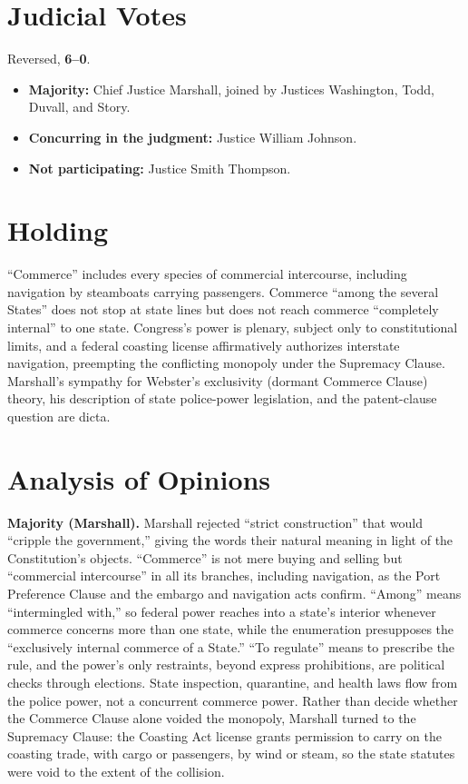 \documentclass[12pt]{article}
\begin{document}
\section{Judicial Votes}

Reversed, \textbf{6--0}.
\begin{itemize}
\item \textbf{Majority:} Chief Justice Marshall, joined by Justices Washington, Todd, Duvall, and Story.
\item \textbf{Concurring in the judgment:} Justice William Johnson.
\item \textbf{Not participating:} Justice Smith Thompson.
\end{itemize}

\section{Holding}

``Commerce'' includes every species of commercial intercourse, including navigation by steamboats carrying passengers. Commerce ``among the several States'' does not stop at state lines but does not reach commerce ``completely internal'' to one state. Congress's power is plenary, subject only to constitutional limits, and a federal coasting license affirmatively authorizes interstate navigation, preempting the conflicting monopoly under the Supremacy Clause. Marshall's sympathy for Webster's exclusivity (dormant Commerce Clause) theory, his description of state police-power legislation, and the patent-clause question are dicta.

\section{Analysis of Opinions}

\textbf{Majority (Marshall).} Marshall rejected ``strict construction'' that would ``cripple the government,'' giving the words their natural meaning in light of the Constitution's objects. ``Commerce'' is not mere buying and selling but ``commercial intercourse'' in all its branches, including navigation, as the Port Preference Clause and the embargo and navigation acts confirm. ``Among'' means ``intermingled with,'' so federal power reaches into a state's interior whenever commerce concerns more than one state, while the enumeration presupposes the ``exclusively internal commerce of a State.'' ``To regulate'' means to prescribe the rule, and the power's only restraints, beyond express prohibitions, are political checks through elections. State inspection, quarantine, and health laws flow from the police power, not a concurrent commerce power. Rather than decide whether the Commerce Clause alone voided the monopoly, Marshall turned to the Supremacy Clause: the Coasting Act license grants permission to carry on the coasting trade, with cargo or passengers, by wind or steam, so the state statutes were void to the extent of the collision.
\end{document}
